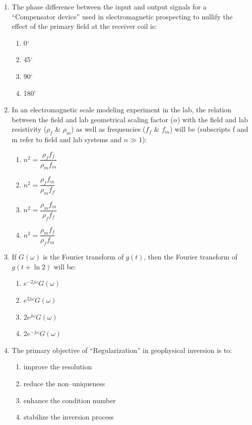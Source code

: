 \documentclass[journal,12pt,onecolumn]{IEEEtran}
\theoremstyle{remark}
\begin{document}
\begin{enumerate}
\item The phase difference between the input and output signals for a ``Compensator device'' used in electromagnetic prospecting to nullify the effect of the primary field at the receiver coil is:
\begin{multicols}{4}
\begin{enumerate}
\item 0$^\circ$
\item 45$^\circ$
\item 90$^\circ$
\item 180$^\circ$
\end{enumerate}
\end{multicols}

\item In an electromagnetic scale modeling experiment in the lab, the relation between the field and lab geometrical scaling factor ($n$) with the field and lab resistivity ($\rho_f$ \& $\rho_m$) as well as frequencies ($f_f$ \& $f_m$) will be (subscripts f and m refer to field and lab systems and $n \gg 1$):
\begin{multicols}{2}
\begin{enumerate}
\item $n^2 = \dfrac{\rho_f f_f}{\rho_m f_m}$
\item $n^2 = \dfrac{\rho_f f_m}{\rho_m f_f}$
\item $n^2 = \dfrac{\rho_m f_m}{\rho_f f_f}$
\item $n^2 = \dfrac{\rho_m f_f}{\rho_f f_m}$
\end{enumerate}
\end{multicols}

\item If $G(\omega)$ is the Fourier transform of $g(t)$, then the Fourier transform of $g(t + \ln 2)$ will be:
\begin{multicols}{2}
\begin{enumerate}
\item $e^{-2j\omega} G(\omega)$
\item $e^{2j\omega} G(\omega)$
\item $2e^{j\omega} G(\omega)$
\item $2e^{-j\omega} G(\omega)$
\end{enumerate}
\end{multicols}

\item The primary objective of ``Regularization'' in geophysical inversion is to:

\begin{multicols}{4}
\begin{enumerate}
\item improve the resolution  
\item reduce the non--uniqueness  
\item enhance the condition number  
\item stabilize the inversion process  
\end{enumerate}
\end{multicols}





\end{enumerate}
\end{document}
